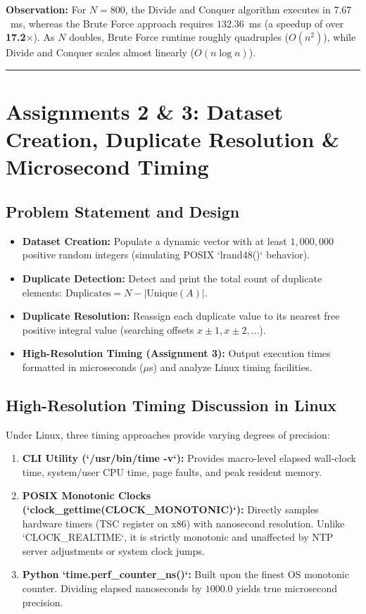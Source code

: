 \documentclass[12pt]{article}
\begin{document}
\textbf{Observation:} For $N = 800$, the Divide and Conquer algorithm executes in $7.67$~ms, whereas the Brute Force approach requires $132.36$~ms (a speedup of over \textbf{17.2$\times$}). As $N$ doubles, Brute Force runtime roughly quadruples ($O(n^2)$), while Divide and Conquer scales almost linearly ($O(n \log n)$).

\vspace{0.3cm}
\hrule
\vspace{0.3cm}

\section{Assignments 2 \& 3: Dataset Creation, Duplicate Resolution \& Microsecond Timing}

\subsection{Problem Statement and Design}
\begin{itemize}
    \item \textbf{Dataset Creation:} Populate a dynamic vector with at least $1,000,000$ positive random integers (simulating POSIX `lrand48()` behavior).
    \item \textbf{Duplicate Detection:} Detect and print the total count of duplicate elements: $\text{Duplicates} = N - |\text{Unique}(A)|$.
    \item \textbf{Duplicate Resolution:} Reassign each duplicate value to its nearest free positive integral value (searching offsets $x \pm 1, x \pm 2, \dots$).
    \item \textbf{High-Resolution Timing (Assignment 3):} Output execution times formatted in microseconds ($\mu$s) and analyze Linux timing facilities.
\end{itemize}

\subsection{High-Resolution Timing Discussion in Linux}
Under Linux, three timing approaches provide varying degrees of precision:
\begin{enumerate}
    \item \textbf{CLI Utility (`/usr/bin/time -v`):} Provides macro-level elapsed wall-clock time, system/user CPU time, page faults, and peak resident memory.
    \item \textbf{POSIX Monotonic Clocks (`clock\_gettime(CLOCK\_MONOTONIC)`):} Directly samples hardware timers (TSC register on x86) with nanosecond resolution. Unlike `CLOCK\_REALTIME`, it is strictly monotonic and unaffected by NTP server adjustments or system clock jumps.
    \item \textbf{Python `time.perf_counter_ns()`:} Built upon the finest OS monotonic counter. Dividing elapsed nanoseconds by $1000.0$ yields true microsecond precision.
\end{enumerate}
\end{document}
